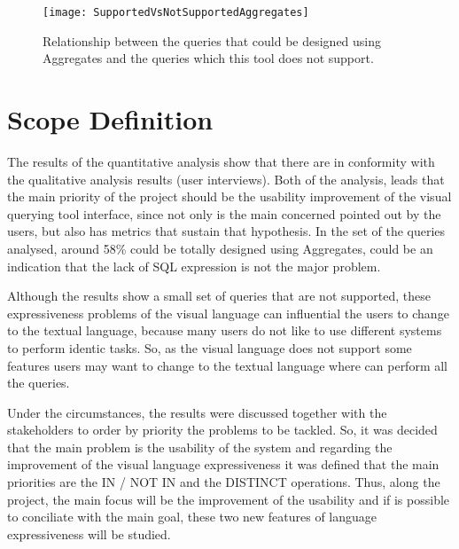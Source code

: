 \begin{figure}[htbp]
	\centering
	\texttt{[image: SupportedVsNotSupportedAggregates]}
	\caption{Relationship between the queries that could be designed using Aggregates and the queries which this tool does not support.}
	\label{fig:aggregates_supported_vs_not_supported_stats}
\end{figure}

\section{Scope Definition}
\label{sec:scope_definition}
The results of the quantitative analysis show that there are in conformity with the qualitative analysis results (user interviews). Both of the analysis, leads that the main priority of the project should be the usability improvement of the visual querying tool interface, since not only is the main concerned pointed out by the users, but also has metrics that sustain that hypothesis. In the set of the queries analysed, around 58\% could be totally designed using Aggregates, could be an indication that the lack of SQL expression is not the major problem.

Although the results show a small set of queries that are not supported, these expressiveness problems of the visual language can influential the users to change to the textual language, because many users do not like to use different systems to perform identic tasks. So, as the visual language does not support some features users may want to change to the textual language where can perform all the queries.

Under the circumstances, the results were discussed together with the stakeholders to order by priority the problems to be tackled. So, it was decided that the main problem is the usability of the system and regarding the improvement of the visual language expressiveness it was defined that the main priorities are the IN / NOT IN and the DISTINCT operations. Thus, along the project, the main focus will be the improvement of the usability and if is possible to conciliate with the main goal, these two new features of language expressiveness will be studied.

